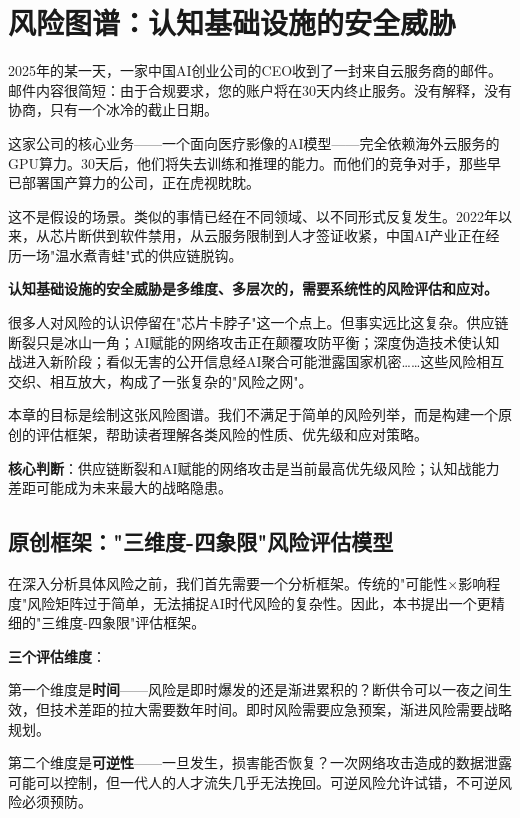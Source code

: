 \chapter{风险图谱：认知基础设施的安全威胁}

2025年的某一天，一家中国AI创业公司的CEO收到了一封来自云服务商的邮件。邮件内容很简短：由于合规要求，您的账户将在30天内终止服务。没有解释，没有协商，只有一个冰冷的截止日期。

这家公司的核心业务——一个面向医疗影像的AI模型——完全依赖海外云服务的GPU算力。30天后，他们将失去训练和推理的能力。而他们的竞争对手，那些早已部署国产算力的公司，正在虎视眈眈。

这不是假设的场景。类似的事情已经在不同领域、以不同形式反复发生。2022年以来，从芯片断供到软件禁用，从云服务限制到人才签证收紧，中国AI产业正在经历一场"温水煮青蛙"式的供应链脱钩。

\textbf{认知基础设施的安全威胁是多维度、多层次的，需要系统性的风险评估和应对。}

很多人对风险的认识停留在"芯片卡脖子"这一个点上。但事实远比这复杂。供应链断裂只是冰山一角；AI赋能的网络攻击正在颠覆攻防平衡；深度伪造技术使认知战进入新阶段；看似无害的公开信息经AI聚合可能泄露国家机密……这些风险相互交织、相互放大，构成了一张复杂的"风险之网"。

本章的目标是绘制这张风险图谱。我们不满足于简单的风险列举，而是构建一个原创的评估框架，帮助读者理解各类风险的性质、优先级和应对策略。

\textbf{核心判断}：供应链断裂和AI赋能的网络攻击是当前最高优先级风险；认知战能力差距可能成为未来最大的战略隐患。

\section{原创框架："三维度-四象限"风险评估模型}

在深入分析具体风险之前，我们首先需要一个分析框架。传统的"可能性×影响程度"风险矩阵过于简单，无法捕捉AI时代风险的复杂性。因此，本书提出一个更精细的"三维度-四象限"评估框架。

\textbf{三个评估维度}：

第一个维度是\textbf{时间}——风险是即时爆发的还是渐进累积的？断供令可以一夜之间生效，但技术差距的拉大需要数年时间。即时风险需要应急预案，渐进风险需要战略规划。

第二个维度是\textbf{可逆性}——一旦发生，损害能否恢复？一次网络攻击造成的数据泄露可能可以控制，但一代人的人才流失几乎无法挽回。可逆风险允许试错，不可逆风险必须预防。

